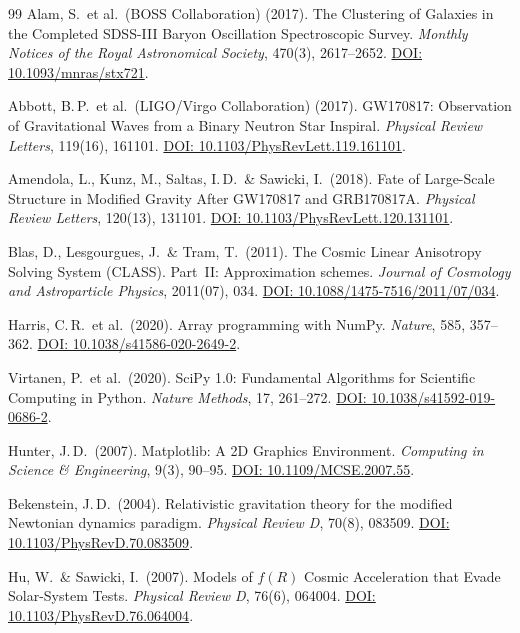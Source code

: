 \documentclass[aps,prd,twocolumn,superscriptaddress,nofootinbib]{revtex4-2}
\begin{document}
\begin{thebibliography}{99}
Alam, S.\ et al.\ (BOSS Collaboration) (2017).
The Clustering of Galaxies in the Completed SDSS-III Baryon Oscillation Spectroscopic Survey.
\textit{Monthly Notices of the Royal Astronomical Society}, 470(3), 2617--2652.
\href{https://doi.org/10.1093/mnras/stx721}{DOI: 10.1093/mnras/stx721}.

Abbott, B.\,P.\ et al.\ (LIGO/Virgo Collaboration) (2017).
GW170817: Observation of Gravitational Waves from a Binary Neutron Star Inspiral.
\textit{Physical Review Letters}, 119(16), 161101.
\href{https://doi.org/10.1103/PhysRevLett.119.161101}{DOI: 10.1103/PhysRevLett.119.161101}.

Amendola, L., Kunz, M., Saltas, I.\,D.\ \& Sawicki, I.\ (2018).
Fate of Large-Scale Structure in Modified Gravity After GW170817 and GRB170817A.
\textit{Physical Review Letters}, 120(13), 131101.
\href{https://doi.org/10.1103/PhysRevLett.120.131101}{DOI: 10.1103/PhysRevLett.120.131101}.

Blas, D., Lesgourgues, J.\ \& Tram, T.\ (2011).
The Cosmic Linear Anisotropy Solving System (CLASS). Part~II: Approximation schemes.
\textit{Journal of Cosmology and Astroparticle Physics}, 2011(07), 034.
\href{https://doi.org/10.1088/1475-7516/2011/07/034}{DOI: 10.1088/1475-7516/2011/07/034}.

Harris, C.\,R.\ et al.\ (2020).
Array programming with NumPy.
\textit{Nature}, 585, 357--362.
\href{https://doi.org/10.1038/s41586-020-2649-2}{DOI: 10.1038/s41586-020-2649-2}.

Virtanen, P.\ et al.\ (2020).
SciPy 1.0: Fundamental Algorithms for Scientific Computing in Python.
\textit{Nature Methods}, 17, 261--272.
\href{https://doi.org/10.1038/s41592-019-0686-2}{DOI: 10.1038/s41592-019-0686-2}.

Hunter, J.\,D.\ (2007).
Matplotlib: A 2D Graphics Environment.
\textit{Computing in Science \& Engineering}, 9(3), 90--95.
\href{https://doi.org/10.1109/MCSE.2007.55}{DOI: 10.1109/MCSE.2007.55}.

Bekenstein, J.\,D.\ (2004).
Relativistic gravitation theory for the modified Newtonian dynamics paradigm.
\textit{Physical Review D}, 70(8), 083509.
\href{https://doi.org/10.1103/PhysRevD.70.083509}{DOI: 10.1103/PhysRevD.70.083509}.

Hu, W.\ \& Sawicki, I.\ (2007).
Models of $f(R)$ Cosmic Acceleration that Evade Solar-System Tests.
\textit{Physical Review D}, 76(6), 064004.
\href{https://doi.org/10.1103/PhysRevD.76.064004}{DOI: 10.1103/PhysRevD.76.064004}.


\end{thebibliography}
\end{document}
